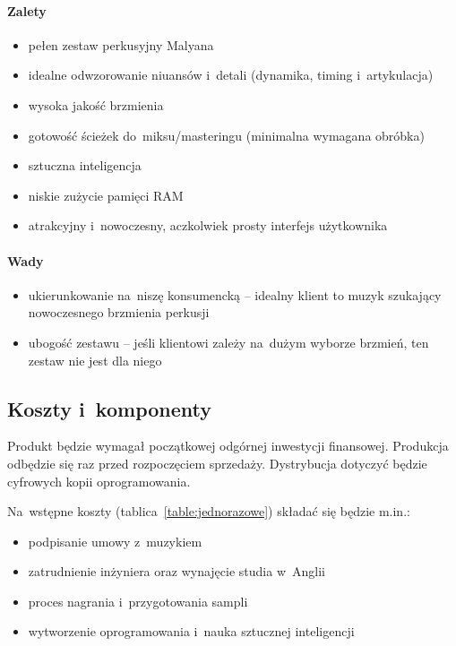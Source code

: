 \documentclass[12pt]{article}
\begin{document}
\paragraph{Zalety}

\begin{itemize}
    \item pełen zestaw perkusyjny Malyana
    \item idealne odwzorowanie niuansów i~detali (dynamika, timing i~artykulacja)
    \item wysoka jakość brzmienia
    \item gotowość ścieżek do~miksu/masteringu (minimalna wymagana obróbka)
    \item sztuczna inteligencja
    \item niskie zużycie pamięci RAM
    \item atrakcyjny i~nowoczesny, aczkolwiek prosty interfejs użytkownika
\end{itemize}

\paragraph{Wady}

\begin{itemize}
    \item ukierunkowanie na~niszę konsumencką -- idealny klient to muzyk szukający nowoczesnego brzmienia perkusji
    \item ubogość zestawu -- jeśli klientowi zależy na~dużym wyborze brzmień, ten zestaw nie jest dla niego
\end{itemize}

\subsection{Koszty i~komponenty}


Produkt będzie wymagał początkowej odgórnej inwestycji finansowej.
Produkcja odbędzie się raz przed rozpoczęciem sprzedaży.
Dystrybucja dotyczyć będzie cyfrowych kopii oprogramowania.

Na~wstępne koszty (tablica~\ref{table:jednorazowe}) składać się będzie m.in.:

\begin{itemize}
    \item podpisanie umowy z~muzykiem
    \item zatrudnienie inżyniera oraz wynajęcie studia w~Anglii
    \item proces nagrania i~przygotowania sampli
    \item wytworzenie oprogramowania i~nauka sztucznej inteligencji
\end{itemize}
\end{document}
